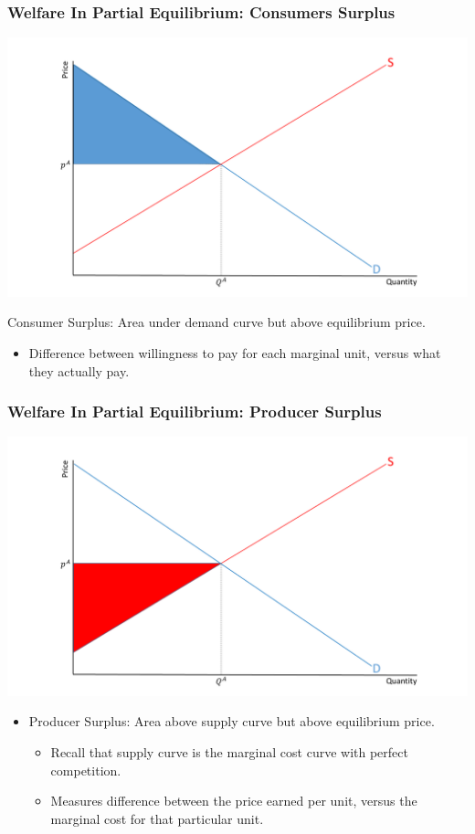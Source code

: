\documentclass{beamer}
\begin{document}
\begin{frame}
	\frametitle{Welfare In Partial Equilibrium: Consumers Surplus}
	\includegraphics[scale=0.30]{SL_2.pdf}

\footnotesize
Consumer Surplus: Area under demand curve but above equilibrium price.
	\footnotesize
		\begin{itemize}
			\item Difference between willingness to pay for each marginal unit, versus what they actually pay.
		\end{itemize}

\end{frame}

\begin{frame}
	\frametitle{Welfare In Partial Equilibrium: Producer Surplus}
	\includegraphics[scale=0.30]{SL_3.pdf}
\scriptsize
	\begin{itemize}
		\item Producer Surplus: Area above supply curve but above equilibrium price.
		\begin{itemize}
			\scriptsize
			\item Recall that supply curve is the marginal cost curve with perfect competition.
			\item Measures difference between the price earned per unit, versus the marginal cost for that particular unit.
		\end{itemize}
	\end{itemize}
\end{frame}
\end{document}
